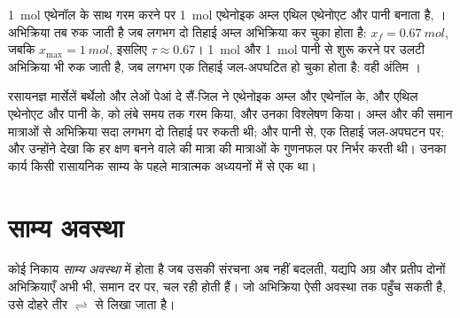 \begin{example}[एक एस्टर जो आधे रास्ते रुक जाता है]\label{ex:g12:equilibrium:berthelot}
\qty{1}{mol} एथेनॉल के साथ गरम करने पर \qty{1}{mol} एथेनोइक अम्ल
एथिल एथेनोएट और पानी बनाता है,
। अभिक्रिया तब रुक जाती है जब लगभग
दो तिहाई अम्ल अभिक्रिया कर चुका होता है: $x_f = \qty{0.67}{mol}$, जबकि
$x_{\max} = \qty{1}{mol}$, इसलिए $\tau \approx 0.67$। \qty{1}{mol}  और
\qty{1}{mol} पानी से शुरू करने पर उलटी अभिक्रिया भी
रुक जाती है, जब लगभग एक तिहाई  जल-अपघटित हो चुका होता है: वही अंतिम
।
\end{example}

\begin{history}[बर्थेलो और पेआं दे सैं-जिल, 1862]
रसायनज्ञ मार्सेलें बर्थेलो और लेओं पेआं दे सैं-जिल ने
एथेनोइक अम्ल और एथेनॉल के, और एथिल एथेनोएट और पानी के,  को
लंबे समय तक गरम किया, और उनका विश्लेषण किया। अम्ल और
 की समान मात्राओं से अभिक्रिया सदा लगभग दो तिहाई पर रुकती थी;  और
पानी से, एक तिहाई जल-अपघटन पर; और उन्होंने देखा कि हर क्षण बनने वाले
 की मात्रा  की मात्राओं के गुणनफल पर निर्भर करती थी।
उनका कार्य किसी रासायनिक साम्य के पहले
मात्रात्मक अध्ययनों में से एक था।
\end{history}

\section{साम्य अवस्था}

\begin{definition}[साम्य अवस्था]\label{def:g12:equilibrium:equilibrium-state}
कोई निकाय \emph{साम्य अवस्था} में होता है जब
उसकी संरचना अब नहीं बदलती, यद्यपि अग्र और
प्रतीप दोनों अभिक्रियाएँ अभी भी, समान दर पर, चल रही होती हैं। जो अभिक्रिया
ऐसी अवस्था तक पहुँच सकती है, उसे दोहरे तीर $\rightleftharpoons$ से लिखा जाता है।
\end{definition}

